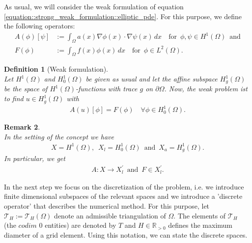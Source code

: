 \documentclass[a4paper,11pt]{article}
\numberwithin{equation}{section}
\newtheorem{definition}{Definition}[section]
\newtheorem{remark}[definition]{Remark}
\newcommand{\theoremNewline}{\hspace{1mm}\\}
\newcommand{\R}{\mathbb{R}}
\newcommand{\Tau}{\mathcal{T}}
\begin{document}
As usual, we will consider the weak formulation of equation \ref{equation::strong_weak_formulation::elliptic_pde}. For this purpose, we define the following operators:
\begin{align*}
A(\phi)[\psi] &:= \int_{\Omega} a(x) \nabla \phi(x) \cdot \nabla \psi(x) \hspace{2pt} dx \quad \mbox{for} \enspace \phi,\psi \in H^1(\Omega) \enspace \mbox{and} \\
F(\phi) &:= \int_{\Omega} f(x) \phi(x) \hspace{2pt} dx \quad \mbox{for} \enspace \phi \in L^2(\Omega).
\end{align*}


\begin{definition}[Weak formulation]\label{definition::strong_weak_formulation::weak_formulation}\theoremNewline
Let $H^1(\Omega)$ and $H^1_0(\Omega)$ be given as usual and let the affine subspace $H^1_g(\Omega)$ be the space of $H^1(\Omega)$-functions with trace $g$ on $\partial \Omega$. Now, the weak problem ist to find $u \in H^1_g(\Omega)$ with
\begin{align}
\label{equation::strong_weak_formulation::analytical_problem1}
A(u)[\phi] = F(\phi) \quad \forall \phi \in H^1_0(\Omega).
\end{align}
\end{definition}

\begin{remark}\theoremNewline
In the setting of the concept we have
\begin{align*}
X=H^1(\Omega), \enspace X_l=H^1_0(\Omega) \enspace \mbox{and} \enspace X_a=H^1_g(\Omega).
\end{align*}
In particular, we get
\begin{align*}
A : X \rightarrow X_l^{\prime} \enspace \mbox{and} \enspace F \in X_l^{\prime}.
\end{align*}
\end{remark}

In the next step we focus on the discretization of the problem, i.e. we introduce finite dimensional subspaces of the relevant spaces and we introduce a 'discrete operator' that describes the numerical method. For this purpose, let $\Tau_H := \Tau_H(\Omega)$ denote an admissible triangulation of $\Omega$. The elements of $\Tau_H$ (the $codim$ 0 entities) are denoted by $T$ and $H \in \R_{>0}$ defines the maximum diameter of a grid element. Using this notation, we can state the discrete spaces.
\end{document}

